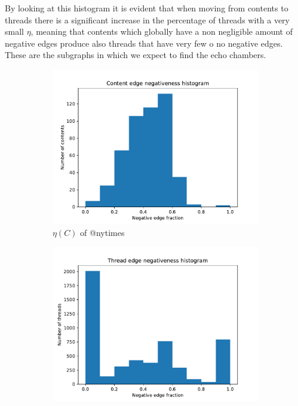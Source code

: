 By looking at this histogram it is evident that when moving from
contents to threads there is a significant increase in the percentage of
threads with a very small $\eta$, meaning that contents which globally have
a non negligible amount of negative edges produce also threads that have
very few o no negative edges. These are the subgraphs in which we expect to find
the echo chambers.

\begin{figure}
	\begin{center}
		\begin{subfigure}[b]{0.4\textwidth}
			\centering
			\includegraphics[width=\textwidth]{tex/out/nytimes700/neg-fraction-content-hist.pdf}
			\caption{$\eta(C)$ of @nytimes}
			\label{fig:nytimes-content-eta}
		\end{subfigure}
		\begin{subfigure}[b]{0.4\textwidth}
			\centering
			\includegraphics[width=\textwidth]{tex/out/nytimes700/neg-fraction-thread-hist.pdf}

\end{subfigure}
\end{center}
\end{figure}
